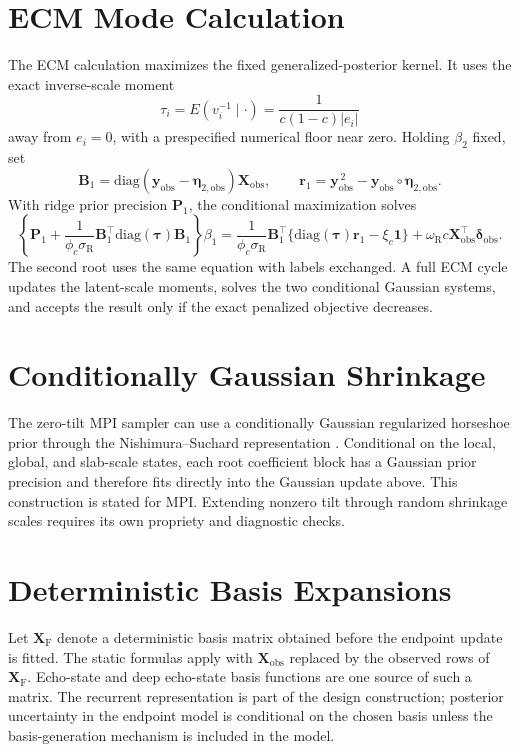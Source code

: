 \documentclass[11pt]{article}
\newcommand{\diag}{\mathrm{diag}}
\newcommand{\vect}[1]{\bm{#1}}
\newcommand{\mat}[1]{\bm{#1}}
\begin{document}
\section{ECM Mode Calculation}
\label{sec:supp-ecm}

The ECM calculation maximizes the fixed generalized-posterior kernel. It uses
the exact inverse-scale moment
\[
\tau_i=E(v_i^{-1}\mid\cdot)=\frac{1}{c(1-c)|e_i|}
\]
away from \(e_i=0\), with a prespecified numerical floor near zero. Holding
\(\beta_2\) fixed, set
\[
\mat B_1=\diag(\vect y_{\mathrm{obs}}-\vect\eta_{2,\mathrm{obs}})
\mat X_{\mathrm{obs}},
\qquad
\vect r_1=\vect y_{\mathrm{obs}}^{\,2}
-\vect y_{\mathrm{obs}}\circ\vect\eta_{2,\mathrm{obs}}.
\]
With ridge prior precision \(\mat P_1\), the conditional maximization solves
\[
\left\{\mat P_1+
\frac{1}{\phi_c\sigma_{\mathrm R}}\mat B_1^\top\diag(\vect\tau)\mat B_1
\right\}\beta_1
=
\frac{1}{\phi_c\sigma_{\mathrm R}}
\mat B_1^\top\{\diag(\vect\tau)\vect r_1-\xi_c\vect 1\}
+\omega_{\mathrm R}c\mat X_{\mathrm{obs}}^\top\vect\delta_{\mathrm{obs}}.
\]
The second root uses the same equation with labels exchanged. A full ECM cycle
updates the latent-scale moments, solves the two conditional Gaussian systems,
and accepts the result only if the exact penalized objective decreases.

\section{Conditionally Gaussian Shrinkage}
\label{sec:supp-shrinkage}

The zero-tilt MPI sampler can use a conditionally Gaussian regularized
horseshoe prior through the Nishimura--Suchard representation
\citep{CarvalhoPolsonScott2010HS,PiironenVehtari2017RHS,NishimuraSuchard2023SSS}.
Conditional on the local, global, and slab-scale states, each root coefficient
block has a Gaussian prior precision and therefore fits directly into the
Gaussian update above. This construction is stated for MPI. Extending nonzero
tilt through random shrinkage scales requires its own propriety and diagnostic
checks.

\section{Deterministic Basis Expansions}
\label{sec:supp-features}

Let \(\mat X_{\mathrm F}\) denote a deterministic basis matrix obtained before
the endpoint update is fitted. The static formulas apply with
\(\mat X_{\mathrm{obs}}\) replaced by the observed rows of
\(\mat X_{\mathrm F}\). Echo-state and deep echo-state basis functions
\citep{Jaeger2001EchoState,GallicchioMicheliPedrelli2018DeepESNDesign} are one
source of such a matrix. The recurrent representation is part of the design
construction; posterior uncertainty in the endpoint model is conditional on the
chosen basis unless the basis-generation mechanism is included in the
model.
\end{document}
